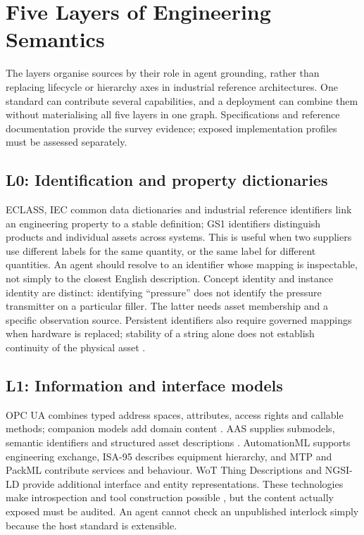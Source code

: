 \section{Five Layers of Engineering Semantics}
\label{sec:layers}
The layers organise sources by their role in agent grounding, rather than
replacing lifecycle or hierarchy axes in industrial reference architectures.
One standard can contribute several capabilities, and a deployment can combine
them without materialising all five layers in one graph. Specifications and
reference documentation provide the survey evidence; exposed implementation
profiles must be assessed separately.

\subsection{L0: Identification and property dictionaries}
ECLASS, IEC common data dictionaries and industrial reference identifiers link
an engineering property to a stable definition; GS1 identifiers distinguish
products and individual assets across systems. This is useful when two suppliers
use different labels for the same quantity, or the same label for different
quantities. An agent should resolve to an identifier whose mapping is inspectable,
not simply to the closest English description. Concept identity and instance
identity are distinct: identifying ``pressure'' does not identify the pressure
transmitter on a particular filler. The latter needs asset membership and a
specific observation source. Persistent identifiers also require governed mappings
when hardware is replaced; stability of a string alone does not establish
continuity of the physical asset \cite{eclass,iec61360,iec61987,iso29002}.

\subsection{L1: Information and interface models}
OPC UA combines typed address spaces, attributes, access rights and callable
methods; companion models add domain content \cite{iec62541}. AAS supplies
submodels, semantic identifiers and structured asset descriptions
\cite{idta2023aas}. AutomationML supports engineering exchange, ISA-95 describes
equipment hierarchy, and MTP and PackML contribute services and behaviour.
WoT Thing Descriptions and NGSI-LD provide additional interface and entity
representations. These technologies make introspection and tool construction
possible \cite{iec62714,iec62264,vdi2658,isa88,w3c2023wot,etsi2023ngsild,iec61850},
but the content actually exposed must be audited. An agent cannot
check an unpublished interlock simply because the host standard is extensible.

